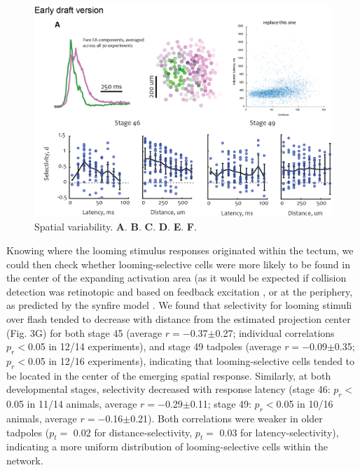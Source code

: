 \documentclass{article}
\begin{document}
\begin{figure}
\includegraphics[width=\linewidth]{fig3.png}
\caption{
Spatial variability. \textbf{A}. \textbf{B}. \textbf{C}. \textbf{D}. \textbf{E}. \textbf{F}. }
\end{figure}

Knowing where the looming stimulus responses originated within the tectum, we could then check whether looming-selective cells were more likely to be found in the center of the expanding activation area (as it would be expected if collision detection was retinotopic \citep{frost2004review} and based on feedback excitation \citep{jang2016}, or at the periphery, as predicted by the synfire model \citep{clopath2010stdpcoding,fiete2010chains}. We found that selectivity for looming stimuli over flash tended to decrease with distance from the estimated projection center (Fig. 3G) for both stage 45 (average $r=-$0.37$\pm$0.27; individual correlations $p_r<$0.05 in 12/14 experiments), and stage 49 tadpoles (average $r=-$0.09$\pm$0.35; $p_r<$0.05 in 12/16 experiments), indicating that looming-selective cells tended to be located in the center of the emerging spatial response. Similarly, at both developmental stages, selectivity decreased with response latency (stage 46: $p_r<$0.05 in 11/14 animals, average $r=-$0.29$\pm$0.11; stage 49: $p_r<$0.05 in 10/16 animals, average $r=-$0.16$\pm$0.21). Both correlations were weaker in older tadpoles ($p_t=$ 0.02 for distance-selectivity, $p_t=$ 0.03 for latency-selectivity), indicating a more uniform distribution of looming-selective cells within the network.

\end{document}
